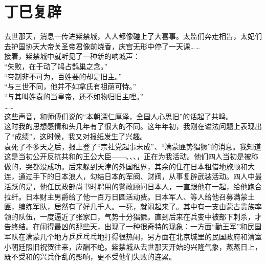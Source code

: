 \fancyhead[RO]{} %
\fancyhead[LE]{} %
\chapter*{丁巳复辟}
\thispagestyle{empty}
去世那天，消息一传进紫禁城，人人都像碰上了大喜事。太监们奔走相告，太妃们去护国协天大帝关圣帝君像前烧香，庆宫无形中停了一天课……\\

接着，紫禁城中就听见了一种新的响城声：\\

“失败，在于动了鸠占鹊巢之念。”\\

“帝制非不可为，百姓要的却是旧主。”\\

“与三世不同，他并不如拿氏有祖荫可恃。”\\

“与其叫姓袁的当皇帝，还不如物归旧主哩。”\\

……\\

这些声音，和师傅们说的“本朝深仁厚泽，全国人心思旧”的话起了共鸣。\\

这时我的思想感情和头几年有了很大的不同。这年年初，我刚在谥法问题上表现出了“成绩”，这时候，我又对报纸发生了兴趣。\\

袁死了不多天之后，报上登了“宗社党起事未成”、“满蒙匪势猖獗”的消息。我知道这是当初公开反抗共和的王公大臣——、、、，正在为我活动。他们四人当初是被称做的，哭都没成功。后来躲到天津的外国租界，其余的住在日本租借地旅顺和大连，通过手下的日本浪人，勾结日本的军阀、财阀，从事复辟武装活动。四人中最活跃的是，他任民政部尚书时聘用的警政顾问日本人，一直跟他在一起，给他跑合拉纤。日本财主男爵给了他一百万日圆活动费。日本军人、等人给他召募满蒙土匪，编练军队，居然有了好几千人。一死，就闹起来了。其中有一支由蒙古贵族率领的队伍，一度逼近了张家口，气势十分猖獗。直到后来在兵变中被部下刺杀，才告终结。在闹得最凶的那些天，出现了一种很奇特的现象：一方面“勤王军”和民国军队在满蒙几个地方乒乒乓乓地打得很热闹，另方面在北京城里的民国政府和清室小朝廷照旧祝贺往来，应酬不绝。紫禁城从去世那天开始的兴隆气象，蒸蒸日上，既不受和的兴兵作乱的影响，更不受他们失败的连累。\\

